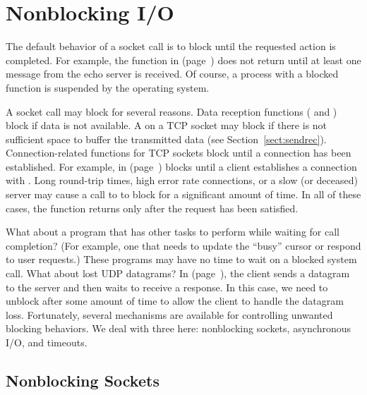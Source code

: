 \section{Nonblocking I/O}
\label{sect:nbio}%

\noindent The default behavior of a socket call is to block until the requested
action is completed.  For example, the  function in
 (page~\pageref{code/TCPEchoClient.c}) does not
return until at least one message from the echo server is received.  Of
course, a process with a blocked function is suspended by the operating
system.

A socket call may block for several reasons.  Data reception functions
( and ) block
if data
is not available.  A  on a TCP socket may block
if there is not sufficient space to buffer the transmitted data
(see Section~\ref{sect:sendrec}).
Connection-related functions for TCP sockets
block until a connection has been established.
For example, 
in  (page~\pageref{code/TCPEchoServer.c})
blocks until a client establishes a connection with
.  Long round-trip times, high
error rate connections, or a slow (or deceased) server may cause a call to
  to block for a significant amount of time.
In all of these cases, the
function returns only after the request has been satisfied.

What about a program that has other tasks to perform while waiting for
call completion?  (For example, one that
needs to update the ``busy'' cursor or respond to user
requests.)  These programs may have no time to wait on a blocked
system call.  What about lost UDP datagrams?  In
 (page~\pageref{code/UDPEchoClient.c}), the client sends
a datagram to the server
and then waits to receive a response.
In this case, we need
 to
unblock after some amount of time to allow the client to handle the
datagram loss.
Fortunately, several mechanisms are available for  controlling
unwanted blocking behaviors.  We deal
with three here:  nonblocking sockets,
asynchronous I/O, and timeouts.

\subsection{Nonblocking Sockets}

